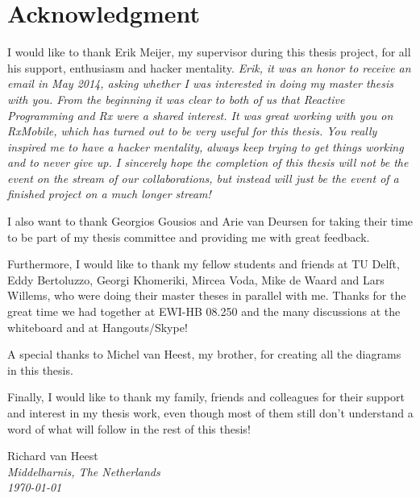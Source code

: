 \chapter*{Acknowledgment}

I would like to thank Erik Meijer, my supervisor during this thesis project, for all his support, enthusiasm and hacker mentality. \textit{Erik, it was an honor to receive an email in May 2014, asking whether I was interested in doing my master thesis with you. From the beginning it was clear to both of us that Reactive Programming and Rx were a shared interest. It was great working with you on RxMobile, which has turned out to be very useful for this thesis. You really inspired me to have a hacker mentality, always keep trying to get things working and to never give up. I sincerely hope the completion of this thesis will not be the  event on the stream of our collaborations, but instead will just be the  event of a finished project on a much longer stream!}

I also want to thank Georgios Gousios and Arie van Deursen for taking their time to be part of my thesis committee and providing me with great feedback.

Furthermore, I would like to thank my fellow students and friends at TU Delft, Eddy Bertoluzzo, Georgi Khomeriki, Mircea Voda, Mike de Waard and Lars Willems, who were doing their master theses in parallel with me. Thanks for the great time we had together at EWI-HB 08.250 and the many discussions at the whiteboard and at Hangouts/Skype!

A special thanks to Michel van Heest, my brother, for creating all the diagrams in this thesis.

Finally, I would like to thank my family, friends and colleagues for their support and interest in my thesis work, even though most of them still don't understand a word of what will follow in the rest of this thesis!

\begin{flushright}
Richard van Heest\\
\textit{Middelharnis, The Netherlands}\\
\textit{\monthyeardate\today}
\end{flushright}